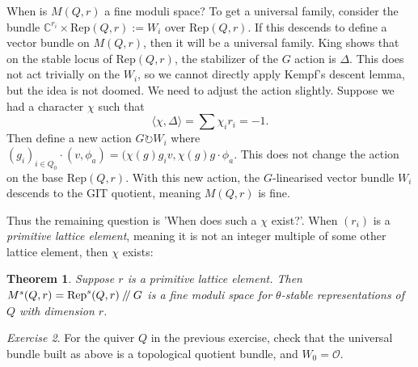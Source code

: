 \documentclass{article}
\newtheorem{theorem}{Theorem}
\theoremstyle{definition}
\theoremstyle{remark}
\newtheorem{exercise}[theorem]{Exercise}
\numberwithin{theorem}{section}
\newcommand{\C}{\mathbb{C}}
\newcommand{\sslash}{\mathbin{/\mkern-4mu/}}
\newcommand{\Rep}{\mathrm{Rep}}
\newenvironment{thm}{
\begin{mdframed}
	\vspace{-0.5em}
	\begin{theorem}
}{
	\end{theorem}
\end{mdframed}
}
\begin{document}
			When is $M(Q,r)$ a fine moduli space? To get a universal family, consider the bundle $\C^{r_i}\times \Rep(Q,r) := W_i$ over $\Rep(Q,r)$. If this descends to define a vector bundle on $M(Q,r)$, then it will be a universal family. King shows that on the stable locus of $\Rep(Q,r)$, the stabilizer of the $G$ action is $\Delta$. This does not act trivially on the $W_i$, so we cannot directly apply Kempf's descent lemma, but the idea is not doomed. We need to adjust the action slightly. Suppose we had a character $\chi$ such that 
			$$\langle \chi, \Delta \rangle = \sum \chi_i r_i = -1.$$
			Then define a new action $G\circlearrowright W_i$ where $(g_i)_{i\in Q_0} \cdot (v, \phi_a) = (\chi(g)g_i v, \chi(g)g\cdot \phi_a$. This does not change the action on the base $\Rep(Q,r)$. With this new action, the $G$-linearised vector bundle $W_i$ descends to the GIT quotient, meaning $M(Q,r)$ is fine. \vspace{1em}
			
			Thus the remaining question is 'When does such a $\chi$ exist?'. When $(r_i)$ is a \emph{primitive lattice element}, meaning it is not an integer multiple of some other lattice element, then $\chi$ exists:
			\begin{thm}
				Suppose $r$ is a primitive lattice element. Then  $M^s(Q,r) = \Rep^s(Q,r)\sslash G$ is a fine moduli space for $\theta$-stable representations of $Q$ with dimension $r$.
			\end{thm}		
			\begin{exercise}
				For the quiver $Q$ in the previous exercise, check that the universal bundle built as above is a  topological quotient bundle, and $W_0 = \mathcal{O}$.
			\end{exercise}
		
\end{document}
